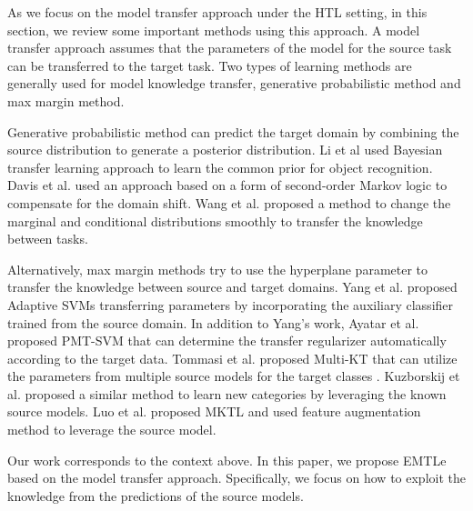 As we focus on the model transfer approach under the HTL setting, in this section, we review some important methods using this approach.
A model transfer approach assumes that the parameters of the model for the source task can be transferred to the target task. Two types of learning methods are generally used for model knowledge transfer, generative probabilistic method and max margin method.
 
Generative probabilistic method can predict the target domain by combining the source distribution to generate a posterior distribution. Li et al \cite{fei2006one} used Bayesian transfer
learning approach to learn the common prior for object recognition. 
Davis et al.\cite{davis2009deep} used an approach based on a form of second-order Markov logic to compensate for the domain shift.
Wang et al.\cite{wang2014active} proposed a method to change the marginal and conditional distributions smoothly to transfer the knowledge between tasks. 

Alternatively, max margin methods try to use the hyperplane parameter to transfer the knowledge between source and target domains.
Yang et al.\cite{yang2007cross} proposed Adaptive SVMs transferring parameters by incorporating the auxiliary classifier trained from the source domain. 
In addition to Yang's work, Ayatar et al.\cite{aytar2011tabula} proposed PMT-SVM that can determine the transfer regularizer automatically according to the target data. 
Tommasi et al.\cite{tommasi2014learning} proposed Multi-KT that can utilize the parameters from multiple source models for the target classes .
Kuzborskij et al.\cite{kuzborskij2013n} proposed a similar method to learn new categories by leveraging the known source models.
Luo et al.\cite{jie2011multiclass} proposed MKTL and used feature augmentation method to leverage the source model.

Our work corresponds to the context above. In this paper, we propose EMTLe based on the model transfer approach. Specifically, we focus on how to exploit the knowledge from the predictions of the source models.
